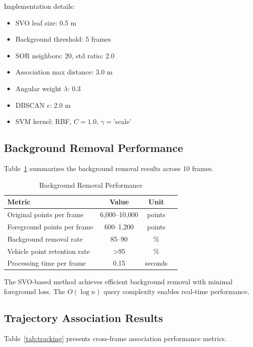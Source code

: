 \documentclass[numbered]{trbunofficial}
\begin{document}
Implementation details:
\begin{itemize}
  \item SVO leaf size: 0.5 m
  \item Background threshold: 5 frames
  \item SOR neighbors: 20, std ratio: 2.0
  \item Association max distance: 3.0 m
  \item Angular weight $\lambda$: 0.3
  \item DBSCAN $\epsilon$: 2.0 m
  \item SVM kernel: RBF, $C=1.0$, $\gamma=$'scale'
\end{itemize}

\subsection{Background Removal Performance}

Table~\ref{tab:background} summarizes the background removal results across 10 frames.

\begin{table}[!ht]
  \caption{Background Removal Performance}\label{tab:background}
  \begin{center}
      \begin{tabular}{lccc}
        \hline
        Metric & Value & Unit \\
        \hline
        Original points per frame & 6,000--10,000 & points \\
        Foreground points per frame & 600--1,200 & points \\
        Background removal rate & 85--90 & \% \\
        Vehicle point retention rate & >95 & \% \\
        Processing time per frame & 0.15 & seconds \\
        \hline
      \end{tabular}
  \end{center}
\end{table}

The SVO-based method achieves efficient background removal with minimal foreground loss. The $O(\log n)$ query complexity enables real-time performance.

\subsection{Trajectory Association Results}

Table~\ref{tab:tracking} presents cross-frame association performance metrics.
\end{document}
